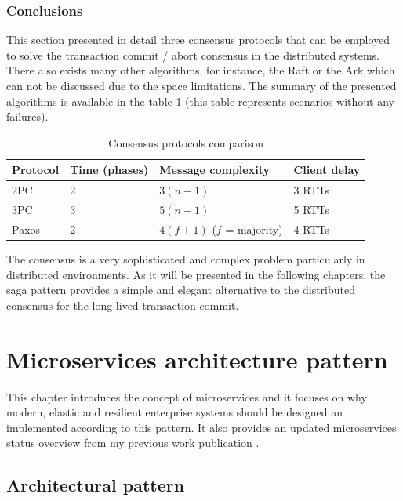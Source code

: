\documentclass[oneside,
  digital, %
  table,   %
  nolof,     %
  nolot,     %
]{fithesis3}
\begin{document}
\subsection{Conclusions}

This section presented in detail three consensus protocols that can be employed to solve the transaction commit / abort consensus in the distributed systems. There also exists many other algorithms, for instance, the Raft or the Ark which can not be discussed due to the space limitations. The summary of the presented algorithms is available in the table \ref{tab:consensus-protocols-comparison} (this table represents scenarios without any failures).

\begin{table}
    \begin{tabularx}{\textwidth}{lllX}
        \toprule
        Protocol & Time (phases) & Message complexity & Client delay \\
        \midrule
        2PC & 2 & $3(n - 1)$ & 3 RTTs \\
        3PC & 3 & $5(n - 1)$ & 5 RTTs \\
        Paxos & 2 & $4(f + 1)$ ($f$ = majority) & 4 RTTs \\
        \bottomrule
    \end{tabularx}
    \caption{Consensus protocols comparison}
    \label{tab:consensus-protocols-comparison}
\end{table}

The consensus is a very sophisticated and complex problem particularly in distributed environments. As it will be presented in the following chapters, the saga pattern \cite{sagas_publ} provides a simple and elegant alternative to the distributed consensus for the long lived transaction commit.



\clearpage
\chapter{Microservices architecture pattern}

This chapter introduces the concept of microservices and it focuses on why modern, elastic and resilient enterprise systems should be designed an implemented according to this pattern. It also provides an updated microservices status overview from my previous work publication \cite{bachelor_thesis}.

\section{Architectural pattern}
\end{document}
